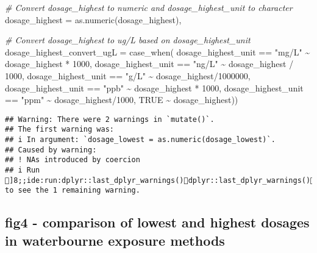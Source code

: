 \documentclass[
]{article}
\newenvironment{Shaded}{\begin{snugshade}}{\end{snugshade}}
\newcommand{\AttributeTok}[1]{\textcolor[rgb]{0.77,0.63,0.00}{#1}}
\newcommand{\CommentTok}[1]{\textcolor[rgb]{0.56,0.35,0.01}{\textit{#1}}}
\newcommand{\ConstantTok}[1]{\textcolor[rgb]{0.00,0.00,0.00}{#1}}
\newcommand{\DecValTok}[1]{\textcolor[rgb]{0.00,0.00,0.81}{#1}}
\newcommand{\FunctionTok}[1]{\textcolor[rgb]{0.00,0.00,0.00}{#1}}
\newcommand{\NormalTok}[1]{#1}
\newcommand{\SpecialCharTok}[1]{\textcolor[rgb]{0.00,0.00,0.00}{#1}}
\newcommand{\StringTok}[1]{\textcolor[rgb]{0.31,0.60,0.02}{#1}}
\begin{document}
\begin{Shaded}
\begin{Highlighting}[]
         \CommentTok{\# Convert dosage\_highest to numeric and dosage\_highest\_unit to character}
         \AttributeTok{dosage\_highest =} \FunctionTok{as.numeric}\NormalTok{(dosage\_highest),}
         
         \CommentTok{\# Convert dosage\_highest to ug/L based on dosage\_highest\_unit}
         \AttributeTok{dosage\_highest\_convert\_ugL =} \FunctionTok{case\_when}\NormalTok{(}
\NormalTok{           dosage\_highest\_unit }\SpecialCharTok{==} \StringTok{"mg/L"} \SpecialCharTok{\textasciitilde{}}\NormalTok{ dosage\_highest }\SpecialCharTok{*} \DecValTok{1000}\NormalTok{,}
\NormalTok{           dosage\_highest\_unit }\SpecialCharTok{==} \StringTok{"ng/L"} \SpecialCharTok{\textasciitilde{}}\NormalTok{ dosage\_highest }\SpecialCharTok{/} \DecValTok{1000}\NormalTok{,}
\NormalTok{           dosage\_highest\_unit }\SpecialCharTok{==} \StringTok{"g/L"} \SpecialCharTok{\textasciitilde{}}\NormalTok{ dosage\_highest}\SpecialCharTok{/}\DecValTok{1000000}\NormalTok{,}
\NormalTok{           dosage\_highest\_unit }\SpecialCharTok{==} \StringTok{"ppb"} \SpecialCharTok{\textasciitilde{}}\NormalTok{ dosage\_highest }\SpecialCharTok{*} \DecValTok{1000}\NormalTok{,}
\NormalTok{           dosage\_highest\_unit }\SpecialCharTok{==} \StringTok{"ppm"} \SpecialCharTok{\textasciitilde{}}\NormalTok{ dosage\_highest}\SpecialCharTok{/}\DecValTok{1000}\NormalTok{,}
           \ConstantTok{TRUE} \SpecialCharTok{\textasciitilde{}}\NormalTok{ dosage\_highest))}
\end{Highlighting}
\end{Shaded}

\begin{verbatim}
## Warning: There were 2 warnings in `mutate()`.
## The first warning was:
## i In argument: `dosage_lowest = as.numeric(dosage_lowest)`.
## Caused by warning:
## ! NAs introduced by coercion
## i Run ]8;;ide:run:dplyr::last_dplyr_warnings()dplyr::last_dplyr_warnings()]8;; to see the 1 remaining warning.
\end{verbatim}

\hypertarget{fig4---comparison-of-lowest-and-highest-dosages-in-waterbourne-exposure-methods}{%
\subsection{fig4 - comparison of lowest and highest dosages in
waterbourne exposure
methods}\label{fig4---comparison-of-lowest-and-highest-dosages-in-waterbourne-exposure-methods}}
\end{document}
